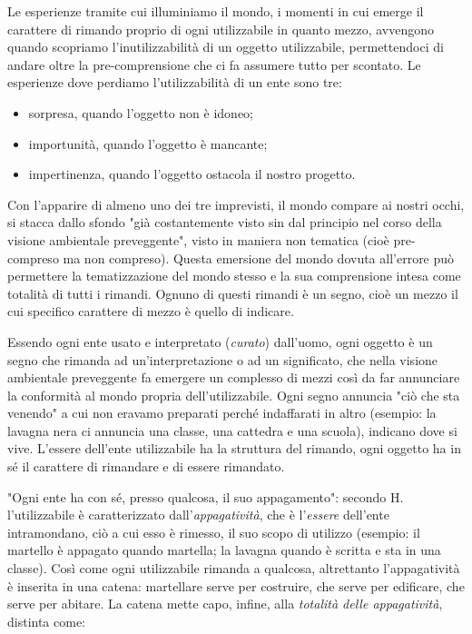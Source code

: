 \documentclass[a4paper,12pt,oneside]{article}%
\begin{document}
Le esperienze tramite cui illuminiamo il mondo, i momenti in cui emerge il carattere di rimando proprio di ogni utilizzabile in quanto mezzo, avvengono quando scopriamo l'inutilizzabilità di un oggetto utilizzabile, permettendoci di andare oltre la pre-comprensione che ci fa assumere tutto per scontato. Le esperienze dove perdiamo l'utilizzabilità di un ente sono tre:

\begin{itemize}
	\item sorpresa, quando l'oggetto non è idoneo;
	\item importunità, quando l'oggetto è mancante;
	\item impertinenza, quando l'oggetto ostacola il nostro progetto.
\end{itemize}

Con l'apparire di almeno uno dei tre imprevisti, il mondo compare ai nostri occhi, si stacca dallo sfondo "già costantemente visto sin dal principio nel corso della visione ambientale preveggente", visto in maniera non tematica (cioè pre-compreso ma non compreso). Questa emersione del mondo dovuta all'errore può permettere la tematizzazione del mondo stesso e la sua comprensione intesa come totalità di tutti i rimandi. Ognuno di questi rimandi è un segno, cioè un mezzo il cui specifico carattere di mezzo è quello di indicare. 

Essendo ogni ente usato e interpretato (\textit{curato}) dall'uomo, ogni oggetto è un segno che rimanda ad un'interpretazione o ad un significato, che nella visione ambientale preveggente fa emergere un complesso di mezzi così da far annunciare la conformità al mondo propria dell'utilizzabile. Ogni segno annuncia "ciò che sta venendo" a cui non eravamo preparati perché indaffarati in altro (esempio: la lavagna nera ci annuncia una classe, una cattedra e una scuola), indicano dove si vive.
L'essere dell'ente utilizzabile ha la struttura del rimando, ogni oggetto ha in sé il carattere di rimandare e di essere rimandato. 

"Ogni ente ha con sé, presso qualcosa, il suo appagamento": secondo H. l'utilizzabile è caratterizzato dall'\textit{appagatività}, che è l'\textit{essere} dell'ente intramondano, ciò a cui esso è rimesso, il suo scopo di utilizzo (esempio: il martello è appagato quando martella; la lavagna quando è scritta e sta in una classe). Così come ogni utilizzabile rimanda a qualcosa, altrettanto l'appagatività è inserita in una catena: martellare serve per costruire, che serve per edificare, che serve per abitare. La catena mette capo, infine, alla \textit{totalità delle appagatività}, distinta come:
\end{document}
